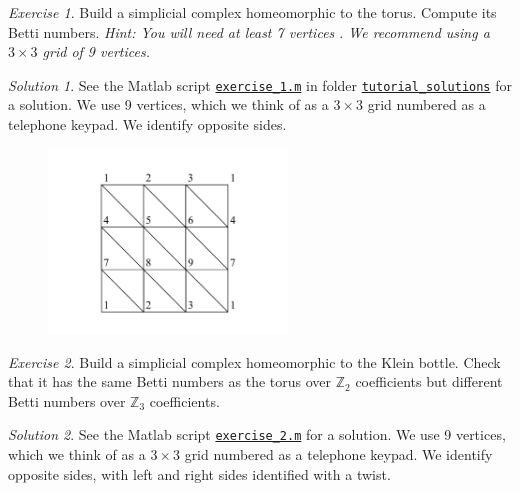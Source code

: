 \documentclass[amscd, amssymb, verbatim]{amsart}[12pt]
\theoremstyle{remark}
\theoremstyle{remark}
\newtheorem{exerciseSol}{Exercise}
\theoremstyle{remark}
\newtheorem*{solution}{Solution}
\begin{document}
\begin{exerciseSol}
Build a simplicial complex homeomorphic to the torus. Compute its Betti numbers. {\em Hint: You will need at least 7 vertices} \citep[page 107]{Hatcher}{\em . We recommend using a $3\times 3$ grid of 9 vertices.}
\end{exerciseSol}

\begin{solution}
See the Matlab script \href{https://github.com/appliedtopology/javaplex/tree/master/src/matlab/for_distribution/tutorial_solutions/exercise_1.m}{\texttt{exercise\_1.m}} in folder \href{https://github.com/appliedtopology/javaplex/tree/master/src/matlab/for_distribution/tutorial_solutions}{\texttt{tutorial\_solutions}} for a solution. We use 9 vertices, which we think of as a $3 \times 3$ grid numbered as a telephone keypad. We identify opposite sides.
\end{solution}

\begin{figure}[htp]
  \begin{center}
    \includegraphics[width=2.5in]{torus}
   \end{center}
\end{figure}
\FloatBarrier

\begin{exerciseSol}
Build a simplicial complex homeomorphic to the Klein bottle. Check that it has the same Betti numbers as the torus over $\mathbb{Z}_2$ coefficients but different Betti numbers over $\mathbb{Z}_3$ coefficients.
\end{exerciseSol}

\begin{solution}
See the Matlab script \href{https://github.com/appliedtopology/javaplex/tree/master/src/matlab/for_distribution/tutorial_solutions/exercise_2.m}{\texttt{exercise\_2.m}} for a solution. We use 9 vertices, which we think of as a $3 \times 3$ grid numbered as a telephone keypad. We identify opposite sides, with left and right sides identified with a twist. 
\end{solution}
\end{document}
